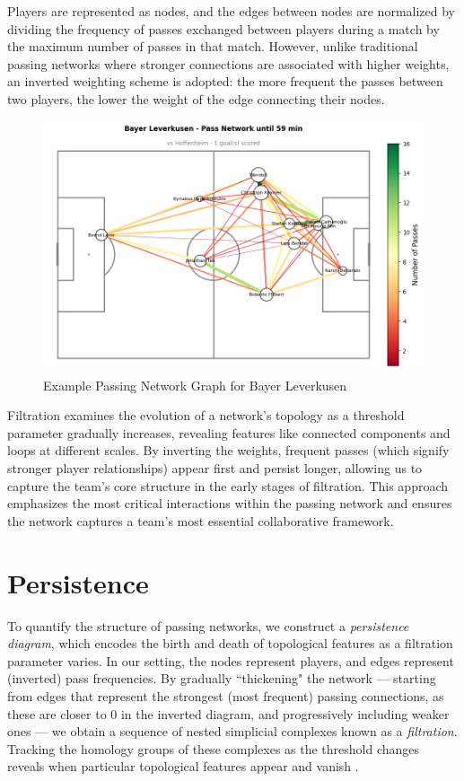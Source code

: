 \documentclass[10pt,twocolumn]{article}
\begin{document}
Players are represented as nodes, and the edges between nodes are normalized by dividing the frequency of passes exchanged between players during a match by the maximum number of passes in that match. However, unlike traditional passing networks where stronger connections are associated with higher weights, an inverted weighting scheme is adopted: the more frequent the passes between two players, the lower the weight of the edge connecting their nodes. 

\begin{figure}[H]
    \centering
    \includegraphics[width= 1 \linewidth]{images/leverkusen.png}
    \caption{Example Passing Network Graph for Bayer Leverkusen}
    \label{fig:leverkusen}
\end{figure}

Filtration examines the evolution of a network's topology as a threshold parameter gradually increases, revealing features like connected components and loops at different scales. By inverting the weights, frequent passes (which signify stronger player relationships) appear first and persist longer, allowing us to capture the team's core structure in the early stages of filtration. This approach emphasizes the most critical interactions within the passing network and ensures the network captures a team's most essential collaborative framework.

\section*{Persistence}

To quantify the structure of passing networks, we construct a \textit{persistence diagram}, which encodes the birth and death of topological features as a filtration parameter varies. In our setting, the nodes represent players, and edges represent (inverted) pass frequencies. By gradually ``thickening" the network — starting from edges that represent the strongest (most frequent) passing connections, as these are closer to 0 in the inverted diagram, and progressively including weaker ones — we obtain a sequence of nested simplicial complexes known as a \textit{filtration}. Tracking the homology groups of these complexes as the threshold changes reveals when particular topological features appear and vanish \cite{aktas-2019}.
\end{document}
